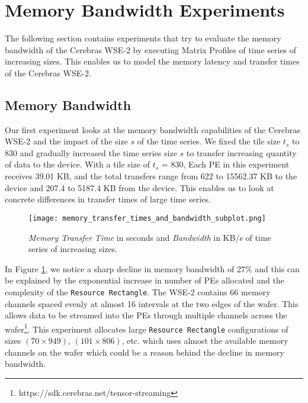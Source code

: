 \section{Memory Bandwidth Experiments} \label{section:memory_bandwidth_experiments}

The following section contains experiments that try to evaluate the memory bandwidth of the Cerebras WSE-2 by executing Matrix Profiles of time series of increasing sizes. This enables us to model the memory latency and transfer times of the Cerebras WSE-2.

\subsection{Memory Bandwidth} \label{subsection:memory_bandwidth}

Our first experiment looks at the memory bandwidth capabilities of the Cerebras WSE-2 and the impact of the size $s$ of the time series. We fixed the tile size $t_s$ to 830 and gradually increased the time series size $s$ to transfer increasing quantity of data to the device. With a tile size of $t_s$ = 830, Each PE in this experiment receives 39.01 KB, and the total transfers range from 622 to 15562.37 KB to the device and 207.4 to 5187.4 KB from the device. This enables us to look at concrete differences in transfer times of large time series.

\begin{figure}[h!]
    \texttt{[image: memory\_transfer\_times\_and\_bandwidth\_subplot.png]}
    \centering
    \caption{\textit{Memory Transfer Time} in seconds and \textit{Bandwidth} in KB/s of time series of increasing sizes.}
    \label{fig:memory_bandwidth}
\end{figure}

In Figure \ref{fig:memory_bandwidth}, we notice a sharp decline in memory bandwidth of 27\% and this can be explained by the exponential increase in number of PEs allocated and the complexity of the \texttt{Resource Rectangle}. The WSE-2 contains 66 memory channels spaced evenly at almost 16 intervals at the two edges of the wafer. This allows data to be streamed into the PEs through multiple channels across the wafer\footnote{https://sdk.cerebras.net/tensor-streaming}. This experiment allocates large \texttt{Resource Rectangle} configurations of sizes $(70\times949)$, $(101\times806)$, etc. which uses almost the available memory channels on the wafer which could be a reason behind the decline in memory bandwidth.

